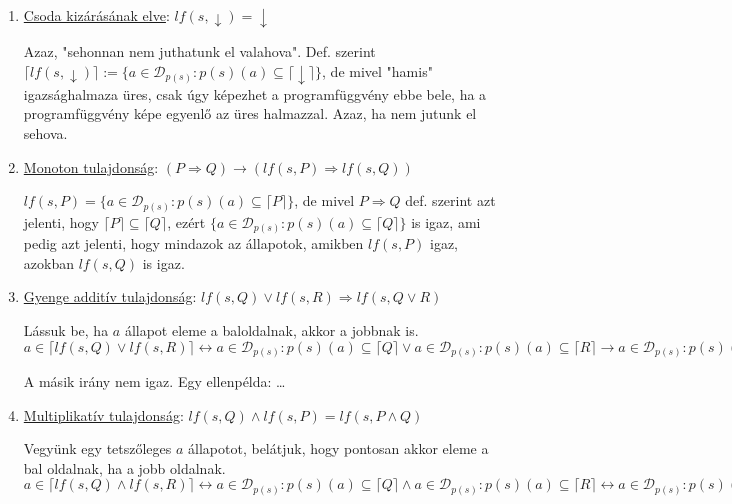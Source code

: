 \documentclass{article}
\begin{document}
\begin{enumerate}
\item \underline{Csoda kizárásának elve}: $lf(s,\downarrow) = \downarrow$

Azaz, "sehonnan nem juthatunk el valahova". Def. szerint $\lceil lf(s,\downarrow) \rceil := \lbrace a \in \mathcal{D}_{p(s)} : p(s)(a) \subseteq \lceil \downarrow \rceil \rbrace $, de mivel "hamis" igazsághalmaza üres, csak úgy képezhet a programfüggvény ebbe bele, ha a programfüggvény képe egyenlő az üres halmazzal. Azaz, ha nem jutunk el sehova.
\item \underline{Monoton tulajdonság}: $(P \Rightarrow Q) \rightarrow (lf(s,P) \Rightarrow lf(s,Q))$

$lf(s,P) = \lbrace a \in \mathcal{D}_{p(s)} : p(s)(a) \subseteq \lceil P \rceil \rbrace$, de mivel $P \Rightarrow Q$ def. szerint azt jelenti, hogy $\lceil P \rceil \subseteq \lceil Q \rceil$, ezért $\lbrace a \in \mathcal{D}_{p(s)} : p(s)(a) \subseteq \lceil Q \rceil \rbrace$ is igaz, ami pedig azt jelenti, hogy mindazok az állapotok, amikben $lf(s,P)$ igaz, azokban $lf(s,Q)$ is igaz.
\item \underline{Gyenge additív tulajdonság}: $lf(s,Q) \lor lf(s,R) \Rightarrow lf(s, Q \lor R)$

Lássuk be, ha $a$ állapot eleme a baloldalnak, akkor a jobbnak is.\\
$a \in \lceil lf(s,Q) \lor lf(s,R) \rceil \longleftrightarrow a \in \mathcal{D}_{p(s)} : p(s)(a) \subseteq \lceil Q \rceil \lor a \in \mathcal{D}_{p(s)} : p(s)(a) \subseteq \lceil R \rceil \rightarrow a \in \mathcal{D}_{p(s)} : p(s)(a) \subseteq \lceil Q \lor R \rceil \lor a \in \mathcal{D}_{p(s)} : p(s)(a) \subseteq \lceil R \lor Q \rceil \longleftrightarrow a \in \mathcal{D}_{p(s)} : p(s)(a) \subseteq \lceil Q \lor R \rceil \longleftrightarrow a \in \lceil lf(s, Q \lor R) \rceil$

A másik irány nem igaz. Egy ellenpélda: \dots

\item \underline{Multiplikatív tulajdonság}: $lf(s,Q) \land lf(s,P) = lf(s, P \land Q)$

Vegyünk egy tetszőleges $a$ állapotot, belátjuk, hogy pontosan akkor eleme a bal oldalnak, ha a jobb oldalnak.\\
$a \in \lceil lf(s,Q) \land lf(s,R) \rceil
\longleftrightarrow
a \in \mathcal{D}_{p(s)} : p(s)(a) \subseteq \lceil Q \rceil \land a \in \mathcal{D}_{p(s)} : p(s)(a) \subseteq \lceil R \rceil
\longleftrightarrow
a \in \mathcal{D}_{p(s)} : p(s)(a) \subseteq \lceil Q \rceil \land p(s)(a) \subseteq \lceil R \rceil
\longleftrightarrow
a \in \mathcal{D}_{p(s)} : p(s)(a) \subseteq \lceil Q \rceil \cap \lceil R \rceil
\longleftrightarrow
a \in \mathcal{D}_{p(s)} : p(s)(a) \subseteq \lceil Q \land R \rceil
\longleftrightarrow
a \in \lceil lf(s, Q \land R) \rceil
$
\end{enumerate}
\end{document}
